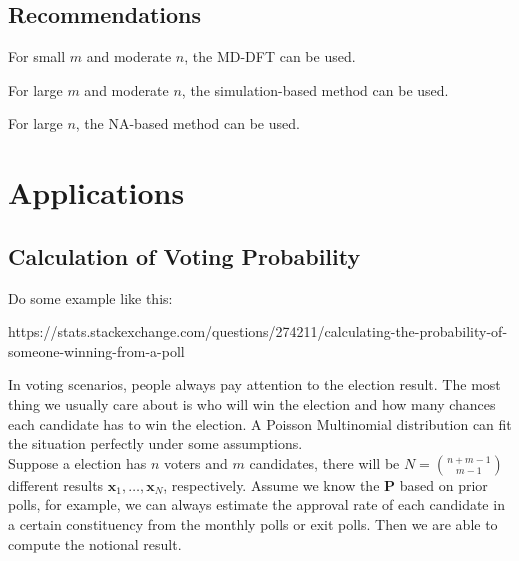 \documentclass[12pt]{article}
\newcommand{\Pmat}{\mathbf{P}}
\begin{document}
\subsection{Recommendations}

For small $m$ and moderate $n$, the MD-DFT can be used.

For large $m$ and moderate $n$, the simulation-based method can be used.

For large $n$, the NA-based method can be used.

\section{Applications}
\subsection{Calculation of Voting Probability}


Do some example like this:

https://stats.stackexchange.com/questions/274211/calculating-the-probability-of-someone-winning-from-a-poll


In voting scenarios, people always pay attention to the election result. The most thing we usually care about is who will win the election and how many chances each candidate has to win the election. A Poisson Multinomial distribution can fit the situation perfectly under some assumptions.\\

Suppose a election has $n$ voters and $m$ candidates, there will be $N = \binom{n+m-1}{m-1}$ different results $\boldsymbol{x}_1,\dots, \boldsymbol{x}_N$, respectively. Assume we know the $\Pmat$ based on prior polls, for example, we can always estimate the approval rate of each candidate in a certain constituency from the monthly polls or exit polls. Then we are able to compute the notional result.\\
\end{document}

